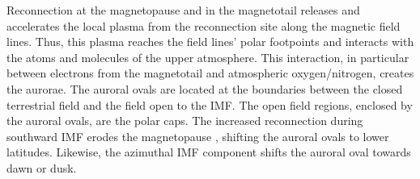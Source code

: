 Reconnection at the magnetopause and in the magnetotail releases and accelerates the local plasma from the reconnection site along the magnetic field lines. Thus, this plasma reaches the field lines' polar footpoints and interacts with the atoms and molecules of the upper atmosphere. This interaction, in particular between electrons from the magnetotail and atmospheric oxygen/nitrogen, creates the aurorae. The auroral ovals are located at the boundaries between the closed terrestrial field and the field open to the IMF. The open field regions, enclosed by the auroral ovals, are the polar caps. The increased reconnection during southward IMF erodes the magnetopause \citep{Aubry1970}, shifting the auroral ovals to lower latitudes. Likewise, the azimuthal IMF component shifts the auroral oval towards dawn or dusk.

